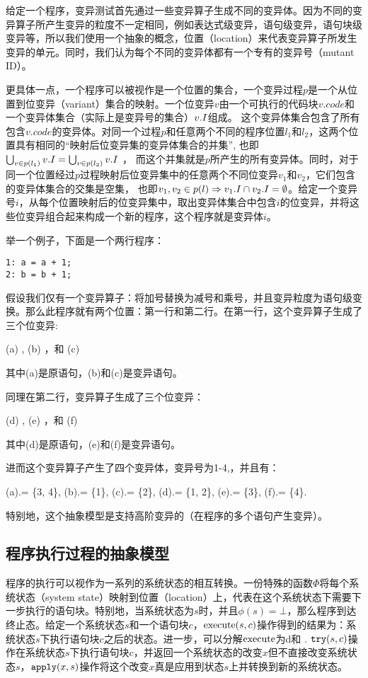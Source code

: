 \documentclass[nofonts]{ctexrep}
\begin{document}
给定一个程序，变异测试首先通过一些变异算子生成不同的变异体。因为不同的变异算子所产生变异的粒度不一定相同，例如表达式级变异，语句级变异，语句块级变异等，所以我们使用一个抽象的概念，位置（location）来代表变异算子所发生变异的单元。同时，我们认为每个不同的变异体都有一个专有的变异号（mutant ID）。

更具体一点，一个程序可以被视作是一个位置的集合，一个变异过程$p$是一个从位置到位变异（variant）集合的映射。一个位变异$v$由一个可执行的代码块$v.code$和一个变异体集合（实际上是变异号的集合）$v.I$组成。
这个变异体集合包含了所有包含$v.code$的变异体。对同一个过程$p$和任意两个不同的程序位置$l_1$和$l_2$，这两个位置具有相同的``映射后位变异集的变异体集合的并集'',
也即$\bigcup_{v \in p(l_1)} v.I=\bigcup_{v \in p(l_2)} v.I$ ，
而这个并集就是$p$所产生的所有变异体。同时，对于同一个位置经过$p$过程映射后位变异集中的任意两个不同位变异$v_1$和$v_2$，它们包含的变异体集合的交集是空集，
也即$v_1, v_2 \in p(l)
\Rightarrow v_1.I \cap v_2.I = \emptyset$。给定一个变异号$i$，从每个位置映射后的位变异集中，取出变异体集合中包含$i$的位变异，并将这些位变异组合起来构成一个新的程序，这个程序就是变异体$i$。

举一个例子，下面是一个两行程序：
\begin{verbatim}
1: a = a + 1;
2: b = b + 1;
\end{verbatim}

假设我们仅有一个变异算子：将加号替换为减号和乘号，并且变异粒度为语句级变换。那么此程序就有两个位置：第一行和第二行。在第一行，这个变异算子生成了三个位变异: 

(a) , (b)
，和 (c) 

其中(a)是原语句，(b)和(c)是变异语句。

同理在第二行，变异算子生成了三个位变异：

(d) , (e)
，和 (f) 

其中(d)是原语句，(e)和(f)是变异语句。

进而这个变异算子产生了四个变异体，变异号为1-4,，并且有：

(a).\mids = \{3, 4\},
(b).\mids = \{1\}, (c).\mids = \{2\}, (d).\mids = \{1, 2\},
(e).\mids = \{3\}, (f).\mids = \{4\}.

特别地，这个抽象模型是支持高阶变异的（在程序的多个语句产生变异）。

\subsection{程序执行过程的抽象模型}
程序的执行可以视作为一系列的系统状态的相互转换。一份特殊的函数$\Phi$将每个系统状态（system state）映射到位置（location）上，代表在这个系统状态下需要下一步执行的语句块。特别地，当系统状态为$s$时，并且$\phi(s)=\bot$，那么程序到达终止态。给定一个系统状态$s$和一个语句块$c$，$\mathrm{execute}(s,c)$操作得到的结果为：系统状态$s$下执行语句块$c$之后的状态。进一步，可以分解$\mathrm{execute}$为d\try 和 \apply.
$\mathtt{try}(s, c)$操作在系统状态$s$下执行语句块$c$，并返回一个系统状态的改变$x$但不直接改变系统状态$s$，$\mathtt{apply}(x, s)$操作将这个改变$x$真是应用到状态$s$上并转换到新的系统状态。 
\end{document}
